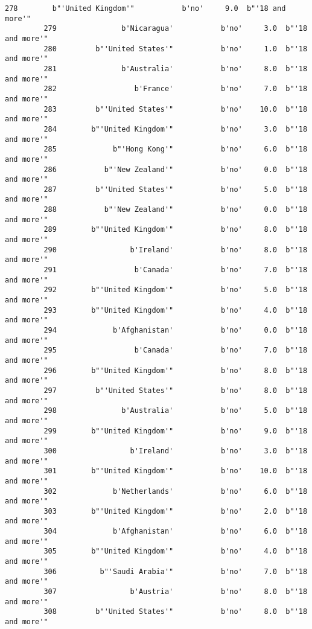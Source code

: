\documentclass[11pt]{article}
\begin{document}
\begin{Verbatim}[commandchars=\\\{\}]
         278        b"'United Kingdom'"           b'no'     9.0  b"'18 and more'"   
         279               b'Nicaragua'           b'no'     3.0  b"'18 and more'"   
         280         b"'United States'"           b'no'     1.0  b"'18 and more'"   
         281               b'Australia'           b'no'     8.0  b"'18 and more'"   
         282                  b'France'           b'no'     7.0  b"'18 and more'"   
         283         b"'United States'"           b'no'    10.0  b"'18 and more'"   
         284        b"'United Kingdom'"           b'no'     3.0  b"'18 and more'"   
         285             b"'Hong Kong'"           b'no'     6.0  b"'18 and more'"   
         286           b"'New Zealand'"           b'no'     0.0  b"'18 and more'"   
         287         b"'United States'"           b'no'     5.0  b"'18 and more'"   
         288           b"'New Zealand'"           b'no'     0.0  b"'18 and more'"   
         289        b"'United Kingdom'"           b'no'     8.0  b"'18 and more'"   
         290                 b'Ireland'           b'no'     8.0  b"'18 and more'"   
         291                  b'Canada'           b'no'     7.0  b"'18 and more'"   
         292        b"'United Kingdom'"           b'no'     5.0  b"'18 and more'"   
         293        b"'United Kingdom'"           b'no'     4.0  b"'18 and more'"   
         294             b'Afghanistan'           b'no'     0.0  b"'18 and more'"   
         295                  b'Canada'           b'no'     7.0  b"'18 and more'"   
         296        b"'United Kingdom'"           b'no'     8.0  b"'18 and more'"   
         297         b"'United States'"           b'no'     8.0  b"'18 and more'"   
         298               b'Australia'           b'no'     5.0  b"'18 and more'"   
         299        b"'United Kingdom'"           b'no'     9.0  b"'18 and more'"   
         300                 b'Ireland'           b'no'     3.0  b"'18 and more'"   
         301        b"'United Kingdom'"           b'no'    10.0  b"'18 and more'"   
         302             b'Netherlands'           b'no'     6.0  b"'18 and more'"   
         303        b"'United Kingdom'"           b'no'     2.0  b"'18 and more'"   
         304             b'Afghanistan'           b'no'     6.0  b"'18 and more'"   
         305        b"'United Kingdom'"           b'no'     4.0  b"'18 and more'"   
         306          b"'Saudi Arabia'"           b'no'     7.0  b"'18 and more'"   
         307                 b'Austria'           b'no'     8.0  b"'18 and more'"   
         308         b"'United States'"           b'no'     8.0  b"'18 and more'"   

\end{Verbatim}
\end{document}
